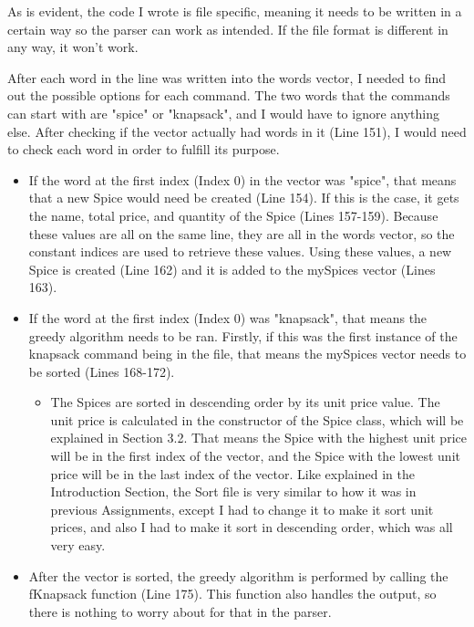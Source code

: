 \documentclass[letterpaper, 10pt]{article}
\begin{document}
\noindent
As is evident, the code I wrote is file specific, meaning it needs to be written in a certain way so the parser can work as intended. If the file format is different in any way, it won't work.

\vspace{1em}
\noindent
After each word in the line was written into the words vector, I needed to find out the possible options for each command. The two words that the commands can start with are "spice" or "knapsack", and I would have to ignore anything else. After checking if the vector actually had words in it (Line 151), I would need to check each word in order to fulfill its purpose.

\begin{itemize}
    \item If the word at the first index (Index 0) in the vector was "spice", that means that a new Spice would need be created (Line 154). If this is the case, it gets the name, total price, and quantity of the Spice (Lines 157-159). Because these values are all on the same line, they are all in the words vector, so the constant indices are used to retrieve these values. Using these values, a new Spice is created (Line 162) and it is added to the mySpices vector (Lines 163).
    \item If the word at the first index (Index 0) was "knapsack", that means the greedy algorithm needs to be ran. Firstly, if this was the first instance of the knapsack command being in the file, that means the mySpices vector needs to be sorted (Lines 168-172). 
    \begin{itemize}
        \item The Spices are sorted in descending order by its unit price value. The unit price is calculated in the constructor of the Spice class, which will be explained in Section 3.2. That means the Spice with the highest unit price will be in the first index of the vector, and the Spice with the lowest unit price will be in the last index of the vector. Like explained in the Introduction Section, the Sort file is very similar to how it was in previous Assignments, except I had to change it to make it sort unit prices, and also I had to make it sort in descending order, which was all very easy.
    \end{itemize}
    \item After the vector is sorted, the greedy algorithm is performed by calling the fKnapsack function (Line 175). This function also handles the output, so there is nothing to worry about for that in the parser. 
\end{itemize}
\end{document}
